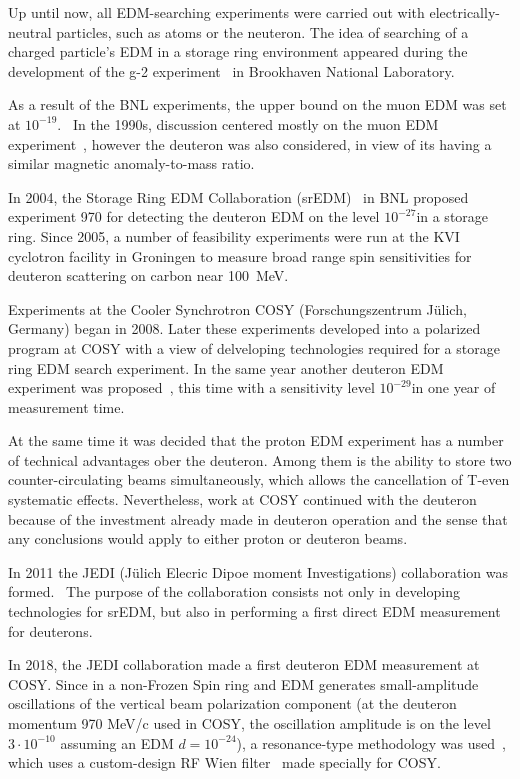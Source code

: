 Up until now, all EDM-searching experiments were carried out with electrically-neutral particles, such as
atoms or the neuteron. The idea of searching of a charged particle's EDM in a storage ring environment
appeared during the development of the g-2 experiment~\cite{BNL:g-2:2001} in Brookhaven National Laboratory.

As a result of the BNL experiments, the upper bound on the muon EDM was set at
$10^{-19}$\ecm.~\cite{BNL:muon_ANA:2009} In the 1990s, discussion centered mostly on the
muon EDM experiment~\cite{Farley:SREDM:Muon}, however the deuteron was also considered, in view of its having
a similar magnetic anomaly-to-mass ratio.

In 2004, the Storage Ring EDM Collaboration (srEDM)~\cite{BNL:SREDM} in BNL proposed experiment 970
for detecting the deuteron EDM on the level $10^{-27}$\ecm in a storage ring. Since 2005, a number of feasibility
experiments were run at the KVI cyclotron facility in Groningen to measure broad range spin sensitivities
for deuteron scattering on carbon near 100~MeV.

Experiments at the Cooler Synchrotron COSY (Forschungszentrum J\"ulich, Germany) began in 2008. Later
these experiments developed into a polarized program at COSY with a view of delveloping technologies required
for a storage ring EDM search experiment. In the same year another deuteron EDM experiment was
proposed~\cite{BNL:Deuteron2008}, this time with a sensitivity level $10^{-29}$\ecm in one year of measurement
time.

At the same time it was decided that the proton EDM experiment has a number of technical advantages
ober the deuteron. Among them is the ability to store two counter-circulating beams simultaneously,
which allows the cancellation of T-even systematic effects. Nevertheless, work at COSY continued with
the deuteron because of the investment already made in deuteron operation and the sense that any conclusions would apply to either proton or deuteron beams.~\cite[\textbf{Historical background}]{YellowReport}

In 2011 the JEDI (J\"ulich Elecric Dipoe moment Investigations) collaboration was formed.~\cite{JEDI:Website}
The purpose of the collaboration consists not only in developing technologies for srEDM, but also in
performing a first direct EDM measurement for deuterons.

In 2018, the JEDI collaboration made a first deuteron EDM measurement at COSY. Since in a non-Frozen Spin ring
and EDM generates small-amplitude oscillations of the vertical beam polarization component
(at the deuteron momentum 970 MeV/c used in COSY, the oscillation amplitude is on the level $3\cdot10^{-10}$
assuming an EDM $d = 10^{-24}$\ecm), a resonance-type methodology
was used~\cite{COSY:Partially-Frozen-Spin, COSY:SpinTuneMapping}, which uses a custom-design
RF Wien filter~\cite{JSlim:RFWF:Design, JSlim:RFWF:Commisioning} made specially for COSY.

